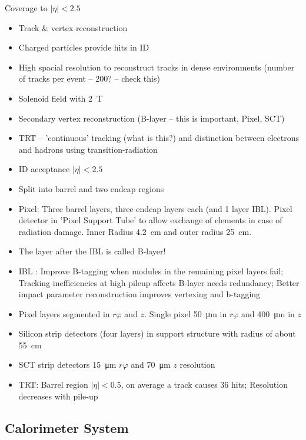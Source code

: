 Coverage to $|\eta| < 2.5$

\begin{itemize}
\item Track \& vertex reconstruction
\item Charged particles provide hits in ID
\item High spacial resolution to reconstruct tracks in dense environments
  (number of tracks per event -- 200? -- check this)
\item Solenoid field with \SI{2}{\tesla}
\item Secondary vertex reconstruction (B-layer -- this is important, Pixel, SCT)
\item TRT -- 'continuous' tracking (what is this?) and distinction between
  electrons and hadrons using transition-radiation
\item ID acceptance $|\eta| < \num{2.5}$
\item Split into barrel and two endcap regions
\item Pixel: Three barrel layers, three endcap layers each (and 1 layer IBL).
  Pixel detector in 'Pixel Support Tube' to allow exchange of elements in case
  of radiation damage. Inner Radius \SI{4.2}{\centi\metre} and outer radius
  \SI{25}{\centi\metre}.
\item The layer after the IBL is called B-layer!
\item IBL \cite{ibl_tdr}: Improve B-tagging when modules in the remaining pixel layers fail;
  Tracking inefficiencies at high pileup affects B-layer needs redundancy;
  Better impact parameter reconstruction improves vertexing and b-tagging
\item Pixel layers segmented in $r\varphi$ and $z$. Single pixel
  \SI{50}{\micro\metre} in $r\varphi$ and \SI{400}{\micro\metre} in $z$
\item Silicon strip detectors (four layers) in support structure with radius of
  about \SI{55}{\centi\metre}
\item SCT strip detectors \SI{15}{\micro\metre} $r\varphi$ and
  \SI{70}{\micro\metre} $z$ resolution
\item TRT: Barrel region $|\eta| < \num{0.5}$, on average a track causes 36
  hits; Resolution decreases with pile-up
\end{itemize}

\subsection{Calorimeter System}
\label{sec:atlas_calo}


